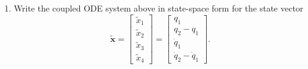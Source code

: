 \documentclass[11pt]{article}
\begin{document}
\begin{enumerate}
    \item[(b)] Write the coupled ODE system above in state-space form for the state vector
    \[
    \tilde{\mathbf{x}}=
    \begin{bmatrix}
    \tilde{x}_1\\\tilde{x}_2\\\tilde{x}_3\\\tilde{x}_4
    \end{bmatrix}
    =
    \begin{bmatrix}
    q_1\\q_2-q_1\\\dot{q}_1\\\dot{q}_2-\dot{q}_1
    \end{bmatrix}.
    \]
\end{enumerate}
\end{document}
